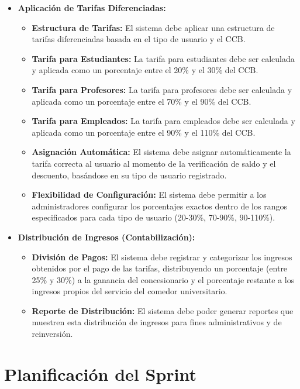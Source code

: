 \documentclass[12pt]{article}
\begin{document}
\begin{itemize}
    \item \textbf{Aplicación de Tarifas Diferenciadas:}
    \begin{itemize}
        \item \textbf{Estructura de Tarifas:} El sistema debe aplicar una estructura de tarifas diferenciadas basada en el tipo de usuario y el CCB.
        \item \textbf{Tarifa para Estudiantes:} La tarifa para estudiantes debe ser calculada y aplicada como un porcentaje entre el 20\% y el 30\% del CCB.
        \item \textbf{Tarifa para Profesores:} La tarifa para profesores debe ser calculada y aplicada como un porcentaje entre el 70\% y el 90\% del CCB.
        \item \textbf{Tarifa para Empleados:} La tarifa para empleados debe ser calculada y aplicada como un porcentaje entre el 90\% y el 110\% del CCB.
        \item \textbf{Asignación Automática:} El sistema debe asignar automáticamente la tarifa correcta al usuario al momento de la verificación de saldo y el descuento, basándose en su tipo de usuario registrado.
		\item \textbf{Flexibilidad de Configuración:} El sistema debe permitir a los administradores configurar los porcentajes exactos dentro de los rangos especificados para cada tipo de usuario (20-30\%, 70-90\%, 90-110\%).
    \end{itemize}

    \item \textbf{Distribución de Ingresos (Contabilización):}
    \begin{itemize}
        \item \textbf{División de Pagos:} El sistema debe registrar y categorizar los ingresos obtenidos por el pago de las tarifas, distribuyendo un porcentaje (entre 25\% y 30\%) a la ganancia del concesionario y el porcentaje restante a los ingresos propios del servicio del comedor universitario.
        \item \textbf{Reporte de Distribución:} El sistema debe poder generar reportes que muestren esta distribución de ingresos para fines administrativos y de reinversión.
    \end{itemize}
\end{itemize}

\pagebreak

\section{Planificación del Sprint}
\end{document}
